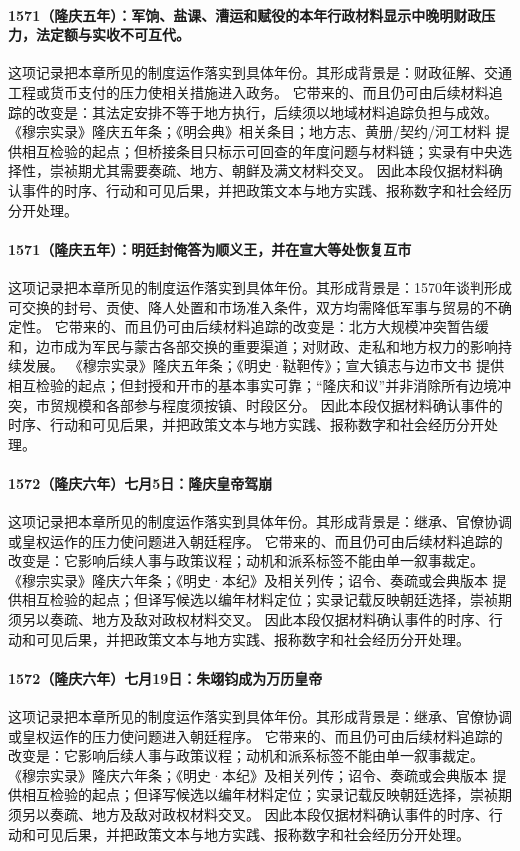 \paragraph{1571（隆庆五年）：军饷、盐课、漕运和赋役的本年行政材料显示中晚明财政压力，法定额与实收不可互代。} 这项记录把本章所见的制度运作落实到具体年份。其形成背景是：财政征解、交通工程或货币支付的压力使相关措施进入政务。 它带来的、而且仍可由后续材料追踪的改变是：其法定安排不等于地方执行，后续须以地域材料追踪负担与成效。 《穆宗实录》隆庆五年条；《明会典》相关条目；地方志、黄册/契约/河工材料 提供相互检验的起点；但桥接条目只标示可回查的年度问题与材料链；实录有中央选择性，崇祯期尤其需要奏疏、地方、朝鲜及满文材料交叉。 因此本段仅据材料确认事件的时序、行动和可见后果，并把政策文本与地方实践、报称数字和社会经历分开处理。

\paragraph{1571（隆庆五年）：明廷封俺答为顺义王，并在宣大等处恢复互市} 这项记录把本章所见的制度运作落实到具体年份。其形成背景是：1570年谈判形成可交换的封号、贡使、降人处置和市场准入条件，双方均需降低军事与贸易的不确定性。 它带来的、而且仍可由后续材料追踪的改变是：北方大规模冲突暂告缓和，边市成为军民与蒙古各部交换的重要渠道；对财政、走私和地方权力的影响持续发展。 《穆宗实录》隆庆五年条；《明史·鞑靼传》；宣大镇志与边市文书 提供相互检验的起点；但封授和开市的基本事实可靠；“隆庆和议”并非消除所有边境冲突，市贸规模和各部参与程度须按镇、时段区分。 因此本段仅据材料确认事件的时序、行动和可见后果，并把政策文本与地方实践、报称数字和社会经历分开处理。

\paragraph{1572（隆庆六年）七月5日：隆庆皇帝驾崩} 这项记录把本章所见的制度运作落实到具体年份。其形成背景是：继承、官僚协调或皇权运作的压力使问题进入朝廷程序。 它带来的、而且仍可由后续材料追踪的改变是：它影响后续人事与政策议程；动机和派系标签不能由单一叙事裁定。 《穆宗实录》隆庆六年条；《明史·本纪》及相关列传；诏令、奏疏或会典版本 提供相互检验的起点；但译写候选以编年材料定位；实录记载反映朝廷选择，崇祯期须另以奏疏、地方及敌对政权材料交叉。 因此本段仅据材料确认事件的时序、行动和可见后果，并把政策文本与地方实践、报称数字和社会经历分开处理。

\paragraph{1572（隆庆六年）七月19日：朱翊钧成为万历皇帝} 这项记录把本章所见的制度运作落实到具体年份。其形成背景是：继承、官僚协调或皇权运作的压力使问题进入朝廷程序。 它带来的、而且仍可由后续材料追踪的改变是：它影响后续人事与政策议程；动机和派系标签不能由单一叙事裁定。 《穆宗实录》隆庆六年条；《明史·本纪》及相关列传；诏令、奏疏或会典版本 提供相互检验的起点；但译写候选以编年材料定位；实录记载反映朝廷选择，崇祯期须另以奏疏、地方及敌对政权材料交叉。 因此本段仅据材料确认事件的时序、行动和可见后果，并把政策文本与地方实践、报称数字和社会经历分开处理。

